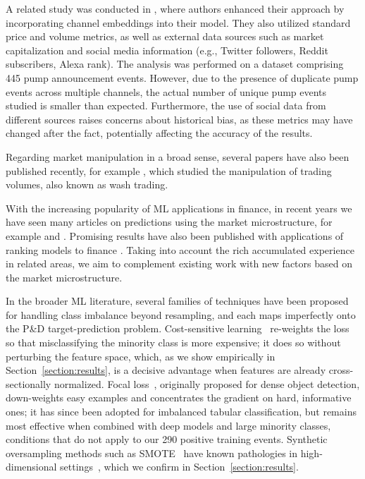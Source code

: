\documentclass{ieeeaccess}
\begin{document}
A related study was conducted in \cite{hu2023sequence}, where authors enhanced their approach by incorporating channel embeddings into their model. They also utilized standard price and volume metrics, as well as external data sources such as market capitalization and social media information (e.g., Twitter followers, Reddit subscribers, Alexa rank). The analysis was performed on a dataset comprising 445 pump announcement events. However, due to the presence of duplicate pump events across multiple channels, the actual number of unique pump events studied is smaller than expected. Furthermore, the use of social data from different sources raises concerns about historical bias, as these metrics may have changed after the fact, potentially affecting the accuracy of the results.

Regarding market manipulation in a broad sense, several papers have also been published recently, for example \cite{cong_washtrading_2023}, which studied the manipulation of trading volumes, also known as wash trading.

With the increasing popularity of ML applications in finance, in recent years we have seen many articles on predictions using the market microstructure, for example \cite{albers_frag_2022} and \cite{ntakaris_midprice_2022}. Promising results have also been published with applications of ranking models to finance \cite{poh_ltr}.  Taking into account the rich accumulated experience in related areas, we aim to complement existing work with new factors based on the market microstructure.

In the broader ML literature, several families of techniques have been proposed for handling class imbalance beyond resampling, and each maps imperfectly onto the P\&D target-prediction problem. Cost-sensitive learning~\cite{elkan2001cost} re-weights the loss so that misclassifying the minority class is more expensive; it does so without perturbing the feature space, which, as we show empirically in Section~\ref{section:results}, is a decisive advantage when features are already cross-sectionally normalized. Focal loss~\cite{lin2017focal}, originally proposed for dense object detection, down-weights easy examples and concentrates the gradient on hard, informative ones; it has since been adopted for imbalanced tabular classification, but remains most effective when combined with deep models and large minority classes, conditions that do not apply to our 290 positive training events. Synthetic oversampling methods such as SMOTE~\cite{chawla2002smote} have known pathologies in high-dimensional settings~\cite{blagus2013smote}, which we confirm in Section~\ref{section:results}.
\end{document}
